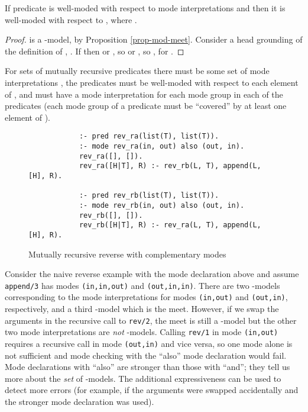 \documentclass{tlp}
\begin{document}
\begin{proposition}
\label{prop-meet-well-moded}
If predicate  is well-moded with respect to mode interpretations
 and  then it is well-moded with respect to
, where .
\end{proposition}
\begin{proof}
 is a -model, by Proposition \ref{prop-mod-meet}.
Consider a head grounding of the definition of , 
.
If  then  or
, so
 or
, so
, for .
\end{proof}
For sets of mutually recursive predicates there must be some set of mode
interpretations , the predicates must be well-moded with respect to
each element of , and  must have a mode interpretation for each
mode group in each of the predicates (each mode group of a predicate
must be ``covered'' by at least one element of ).

\begin{figure}
\begin{verbatim}
            :- pred rev_ra(list(T), list(T)).
            :- mode rev_ra(in, out) also (out, in).
            rev_ra([], []).
            rev_ra([H|T], R) :- rev_rb(L, T), append(L, [H], R).

            :- pred rev_rb(list(T), list(T)).
            :- mode rev_rb(in, out) also (out, in).
            rev_rb([], []).
            rev_rb([H|T], R) :- rev_ra(L, T), append(L, [H], R).
\end{verbatim}
\caption{Mutually recursive reverse with complementary modes\label{fig-rrev}}
\end{figure}

Consider the naive reverse example with the mode declaration above
and assume \texttt{append/3} has modes \texttt{(in,in,out)} and
\texttt{(out,in,in)}.  There are two -models
corresponding to the mode interpretations for modes
\texttt{(in,out)} and \texttt{(out,in)}, respectively, and a third
-model which is the meet.  However, if we swap the
arguments in the recursive call to \texttt{rev/2}, the meet is still
a -model but the other two mode interpretations are
\emph{not} -models.  Calling \texttt{rev/1} in mode
\texttt{(in,out)} requires a recursive call in mode \texttt{(out,in)}
and vice versa, so one mode alone is not sufficient and mode checking
with the ``also'' mode declaration would fail.  Mode declarations with
``also'' are stronger than those with ``and''; they tell us more about the
\emph{set} of -models.  The additional expressiveness
can be used to detect more errors (for example, if the arguments were
swapped accidentally and the stronger mode declaration was used).
\end{document}
